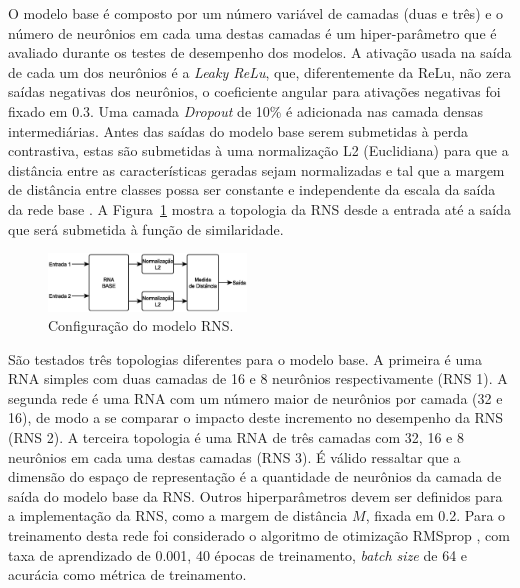 \documentclass[conference,harvard,brazil,english]{sbatex}
\begin{document}
O modelo base é composto por um número variável de camadas (duas e três) e o número de neurônios em cada uma destas camadas é um hiper-parâmetro que é avaliado durante os testes de desempenho dos modelos. A ativação usada na saída de cada um dos neurônios é a \textit{Leaky ReLu}, que, diferentemente da ReLu, não zera saídas negativas dos neurônios, o coeficiente angular para ativações negativas foi fixado em 0.3. Uma camada \textit{Dropout} de 10\% é adicionada nas camada densas intermediárias. Antes das saídas do modelo base serem submetidas à perda contrastiva, estas são submetidas à uma normalização L2 (Euclidiana) para que a distância entre as características geradas sejam normalizadas e tal que a margem de distância entre classes possa ser constante e independente da escala da saída da rede base \cite{SchroffKP15}. A Figura~\ref{fig:base} mostra a topologia da RNS desde a entrada até a saída que será submetida à função de similaridade.

\begin{figure}[!ht]
\centering
\includegraphics[width=0.47\textwidth]{base.eps}
\caption{Configuração do modelo RNS.}
\label{fig:base}
\end{figure}

São testados três topologias diferentes para o modelo base. A primeira é uma RNA simples com duas camadas de 16 e 8 neurônios respectivamente (RNS 1). A segunda rede é uma RNA com um número maior de neurônios por camada (32 e 16), de modo a se comparar o impacto deste incremento no desempenho da RNS (RNS 2). A terceira topologia é uma RNA de três camadas com 32, 16 e 8 neurônios em cada uma destas camadas (RNS 3). É válido ressaltar que a dimensão do espaço de representação é a quantidade de neurônios da camada de saída do modelo base da RNS. Outros hiperparâmetros devem ser definidos para a implementação da RNS, como a margem de distância $M$, fixada em 0.2. Para o treinamento desta rede foi considerado o algoritmo de otimização RMSprop \cite{hinton2012neural}, com taxa de aprendizado de 0.001, 40 épocas de treinamento, \textit{batch size} de 64 e acurácia como métrica de treinamento.
\end{document}
